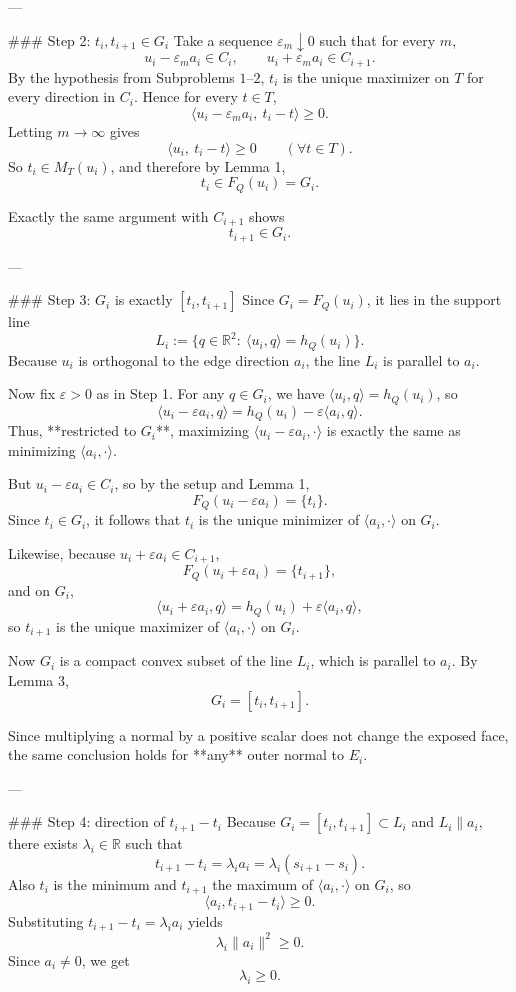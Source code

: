 ---

### Step 2: \(t_i,t_{i+1}\in G_i\)
Take a sequence \(\varepsilon_m\downarrow 0\) such that for every \(m\),
\[
u_i-\varepsilon_m a_i\in C_i,\qquad u_i+\varepsilon_m a_i\in C_{i+1}.
\]
By the hypothesis from Subproblems \(1\)–\(2\), \(t_i\) is the unique maximizer on \(T\) for every direction in \(C_i\). Hence for every \(t\in T\),
\[
\langle u_i-\varepsilon_m a_i,\ t_i-t\rangle\ge 0.
\]
Letting \(m\to\infty\) gives
\[
\langle u_i,\ t_i-t\rangle\ge 0\qquad(\forall t\in T).
\]
So \(t_i\in M_T(u_i)\), and therefore by Lemma 1,
\[
t_i\in F_Q(u_i)=G_i.
\]

Exactly the same argument with \(C_{i+1}\) shows
\[
t_{i+1}\in G_i.
\]

---

### Step 3: \(G_i\) is exactly \([t_i,t_{i+1}]\)
Since \(G_i=F_Q(u_i)\), it lies in the support line
\[
L_i:=\{q\in\mathbb{R}^2:\ \langle u_i,q\rangle=h_Q(u_i)\}.
\]
Because \(u_i\) is orthogonal to the edge direction \(a_i\), the line \(L_i\) is parallel to \(a_i\).

Now fix \(\varepsilon>0\) as in Step 1. For any \(q\in G_i\), we have \(\langle u_i,q\rangle=h_Q(u_i)\), so
\[
\langle u_i-\varepsilon a_i,q\rangle
=h_Q(u_i)-\varepsilon\langle a_i,q\rangle.
\]
Thus, **restricted to \(G_i\)**, maximizing \(\langle u_i-\varepsilon a_i,\cdot\rangle\) is exactly the same as minimizing \(\langle a_i,\cdot\rangle\).

But \(u_i-\varepsilon a_i\in C_i\), so by the setup and Lemma 1,
\[
F_Q(u_i-\varepsilon a_i)=\{t_i\}.
\]
Since \(t_i\in G_i\), it follows that \(t_i\) is the unique minimizer of \(\langle a_i,\cdot\rangle\) on \(G_i\).

Likewise, because \(u_i+\varepsilon a_i\in C_{i+1}\),
\[
F_Q(u_i+\varepsilon a_i)=\{t_{i+1}\},
\]
and on \(G_i\),
\[
\langle u_i+\varepsilon a_i,q\rangle
=h_Q(u_i)+\varepsilon\langle a_i,q\rangle,
\]
so \(t_{i+1}\) is the unique maximizer of \(\langle a_i,\cdot\rangle\) on \(G_i\).

Now \(G_i\) is a compact convex subset of the line \(L_i\), which is parallel to \(a_i\). By Lemma 3,
\[
G_i=[t_i,t_{i+1}].
\]

Since multiplying a normal by a positive scalar does not change the exposed face, the same conclusion holds for **any** outer normal to \(E_i\).

---

### Step 4: direction of \(t_{i+1}-t_i\)
Because \(G_i=[t_i,t_{i+1}]\subset L_i\) and \(L_i\parallel a_i\), there exists \(\lambda_i\in\mathbb{R}\) such that
\[
t_{i+1}-t_i=\lambda_i a_i=\lambda_i(s_{i+1}-s_i).
\]
Also \(t_i\) is the minimum and \(t_{i+1}\) the maximum of \(\langle a_i,\cdot\rangle\) on \(G_i\), so
\[
\langle a_i,t_{i+1}-t_i\rangle\ge 0.
\]
Substituting \(t_{i+1}-t_i=\lambda_i a_i\) yields
\[
\lambda_i\|a_i\|^2\ge 0.
\]
Since \(a_i\neq 0\), we get
\[
\lambda_i\ge 0.
\]

